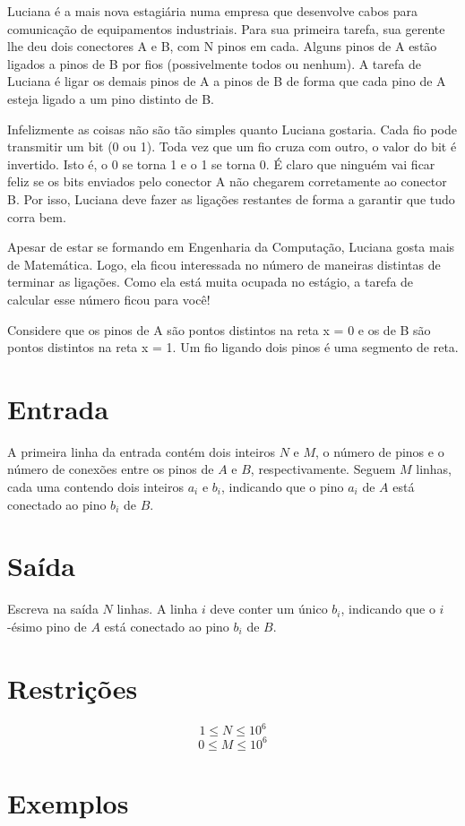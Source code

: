 Luciana é a mais nova estagiária numa empresa que desenvolve cabos para comunicação de equipamentos industriais. Para sua primeira tarefa, sua gerente lhe deu dois conectores A e  B, com N pinos em cada. Alguns pinos de A estão ligados a pinos de B por fios (possivelmente todos ou nenhum). A tarefa de Luciana é ligar os demais pinos de A a pinos de B de forma que cada pino de A esteja ligado a um pino distinto de B.

Infelizmente as coisas não são tão simples quanto Luciana gostaria. Cada fio pode transmitir um bit (0 ou 1). Toda vez que um fio cruza com outro, o valor do bit é invertido. Isto é, o 0 se torna 1 e o 1 se torna 0. É claro que ninguém vai ficar feliz se os bits enviados pelo conector A não chegarem corretamente ao conector B. Por isso, Luciana deve fazer as ligações restantes de forma a garantir que tudo corra bem.

Apesar de estar se formando em Engenharia da Computação, Luciana gosta mais de Matemática. Logo, ela ficou interessada no número de maneiras distintas de terminar as ligações. Como ela está muita ocupada no estágio, a tarefa de calcular esse número ficou para você!

Considere que os pinos de A são pontos distintos na reta x = 0 e os de B são pontos distintos na reta x = 1. Um fio ligando dois pinos é uma segmento de reta.

\section*{Entrada}

A primeira linha da entrada contém dois inteiros $N$ e $M$, o número de pinos e o número de conexões entre os pinos de $A$ e $B$, respectivamente.
Seguem $M$ linhas, cada uma contendo dois inteiros $a_i$ e $b_i$, indicando que o pino $a_i$ de $A$ está conectado ao pino $b_i$ de $B$.

\section*{Saída}

Escreva na saída $N$ linhas. A linha $i$ deve conter um único $b_i$, indicando que o $i$-ésimo pino de $A$ está conectado ao pino $b_i$ de $B$.
 
\section*{Restrições}

$$1 \leq N \leq 10^{6}$$
$$0 \leq M \leq 10^6$$

\section*{Exemplos}
\exemplo
